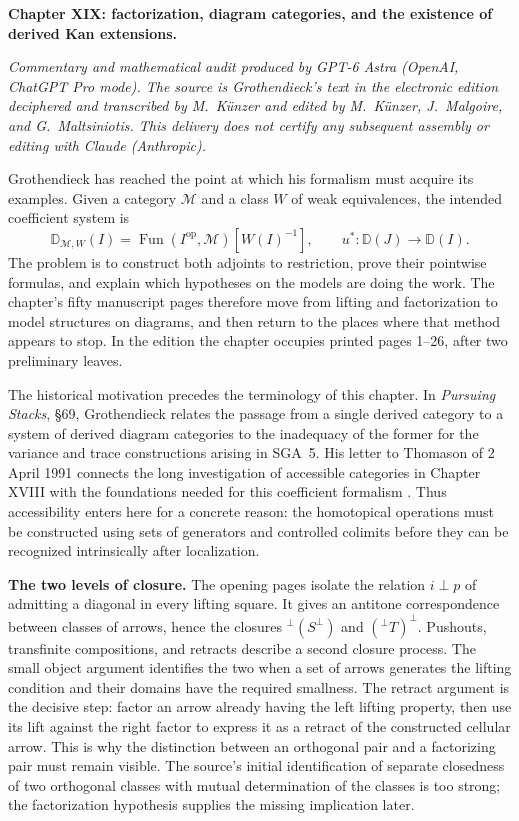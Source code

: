 \begingroup
{}
\noindent\textbf{Chapter XIX: factorization, diagram categories, and the existence of derived Kan extensions.}

\smallskip
\noindent\emph{Commentary and mathematical audit produced by GPT-6 Astra
(OpenAI, ChatGPT Pro mode). The source is Grothendieck's text in the electronic
edition deciphered and transcribed by M.~K\"unzer and edited by M.~K\"unzer,
J.~Malgoire, and G.~Maltsiniotis. This delivery does not certify any subsequent
assembly or editing with Claude (Anthropic).}

\medskip
Grothendieck has reached the point at which his formalism must acquire its
examples. Given a category $\mathcal M$ and a class $W$ of weak equivalences,
the intended coefficient system is
\[
 \mathbb D_{\mathcal M,W}(I)
   =\operatorname{Fun}(I^{\mathrm{op}},\mathcal M)[W(I)^{-1}],
 \qquad u^*:\mathbb D(J)\longrightarrow\mathbb D(I).
\]
The problem is to construct both adjoints to restriction, prove their pointwise
formulas, and explain which hypotheses on the models are doing the work. The
chapter's fifty manuscript pages therefore move from lifting and factorization
to model structures on diagrams, and then return to the places where that
method appears to stop. In the edition the chapter occupies printed pages 1--26,
after two preliminary leaves.

The historical motivation precedes the terminology of this chapter. In
\emph{Pursuing Stacks}, \S69, Grothendieck relates the passage from a single
derived category to a system of derived diagram categories to the inadequacy
of the former for the variance and trace constructions arising in SGA~5.
His letter to Thomason of 2 April 1991 connects the long investigation of
accessible categories in Chapter XVIII with the foundations needed for this
coefficient formalism \citep{Grothendieck1983,Grothendieck1991Letter}. Thus
accessibility enters here for a concrete reason: the homotopical operations
must be constructed using sets of generators and controlled colimits before
they can be recognized intrinsically after localization.

\noindent\textbf{The two levels of closure.}
The opening pages isolate the relation $i\mathbin{\perp}p$ of admitting a
diagonal in every lifting square. It gives an antitone correspondence between
classes of arrows, hence the closures
${}^{\perp}(S^{\perp})$ and $({}^{\perp}T)^{\perp}$. Pushouts, transfinite
compositions, and retracts describe a second closure process. The small
object argument identifies the two when a set of arrows generates the
lifting condition and their domains have the required smallness. The
retract argument is the decisive step: factor an arrow already having the
left lifting property, then use its lift against the right factor to express
it as a retract of the constructed cellular arrow. This is why the distinction
between an orthogonal pair and a factorizing pair must remain visible.
The source's initial identification of separate closedness of two orthogonal
classes with mutual determination of the classes is too strong; the
factorization hypothesis supplies the missing implication later.

